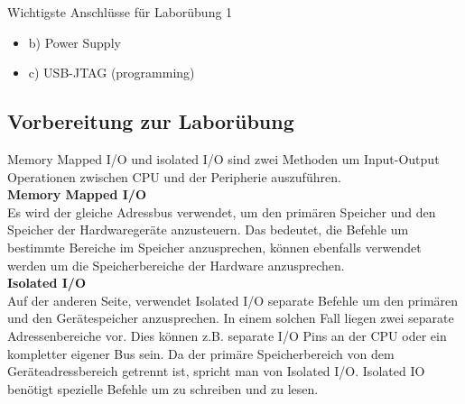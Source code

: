 Wichtigste Anschlüsse für Laborübung 1
\begin{itemize}
\item b) Power Supply
\item c) USB-JTAG (programming)
\end{itemize}


\subsection{Vorbereitung zur Laborübung}
Memory Mapped I/O und isolated I/O sind zwei Methoden um Input-Output Operationen zwischen CPU und der Peripherie auszuführen.\\

\textbf{Memory Mapped I/O}\\
Es wird der gleiche Adressbus verwendet, um den primären Speicher und den Speicher der Hardwaregeräte anzusteuern. Das bedeutet, die Befehle um bestimmte Bereiche im Speicher anzusprechen, können ebenfalls verwendet werden um die Speicherbereiche der Hardware anzusprechen.\\

\textbf{Isolated I/O}\\
Auf der anderen Seite, verwendet Isolated I/O separate Befehle um den primären und den Gerätespeicher anzusprechen. In einem solchen Fall liegen zwei separate Adressenbereiche vor. Dies können z.B. separate I/O Pins an der CPU oder ein kompletter eigener Bus sein. Da der primäre Speicherbereich von dem Geräteadressbereich getrennt ist, spricht man von Isolated I/O. Isolated IO benötigt spezielle Befehle um zu schreiben und zu lesen.
